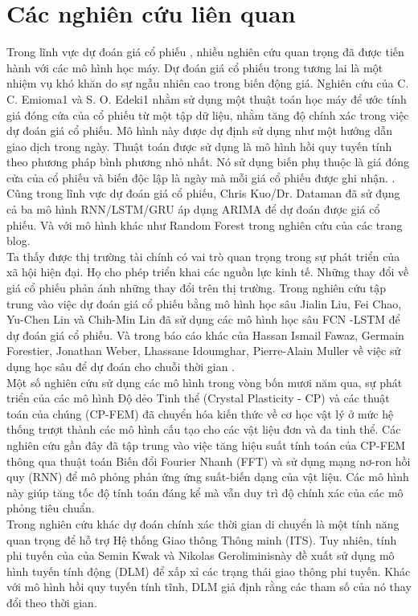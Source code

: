 \documentclass[conference]{IEEEtran}
\begin{document}
\section{Các nghiên cứu liên quan}
Trong lĩnh vực dự đoán giá cổ phiếu , nhiều nghiên cứu quan trọng đã được tiến hành với các mô hình học máy. Dự đoán giá cổ phiếu trong tương lai là một nhiệm vụ khó khăn do sự ngẫu nhiên cao trong biến động giá. Nghiên cứu của C. C. Emioma1 và S. O. Edeki1 nhằm sử dụng một thuật toán học máy để ước tính giá đóng cửa của cổ phiếu từ một tập dữ liệu, nhằm tăng độ chính xác trong việc dự đoán giá cổ phiếu. Mô hình này được dự định sử dụng như một hướng dẫn giao dịch trong ngày. Thuật toán được sử dụng là mô hình hồi quy tuyến tính theo phương pháp bình phương nhỏ nhất. Nó sử dụng biến phụ thuộc là giá đóng cửa của cổ phiếu và biến độc lập là ngày mà mỗi giá cổ phiếu được ghi nhận. \cite{b1}. 
Cũng trong lĩnh vực dự đoán giá cổ phiếu, Chris Kuo/Dr. Dataman đã sử đụng cả ba mô hình RNN/LSTM/GRU áp dụng ARIMA để dự đoán được giá cổ phiếu\cite{b2}. Và với mô hình khác như Random Forest trong nghiên cứu của các trang blog\cite{b3}.\\
Ta thấy được thị trường tài chính có vai trò quan trọng trong sự phát triển của xã hội hiện đại. Họ cho phép triển khai các nguồn lực kinh tế. Những thay đổi về giá cổ phiếu phản ánh những thay đổi trên thị trường. Trong nghiên cứu tập trung vào việc dự đoán giá cổ phiếu bằng mô hình học sâu Jialin Liu, Fei Chao, Yu-Chen Lin và Chih-Min Lin đã sử dụng các mô hình học sâu FCN -LSTM để dự đoán giá cổ phiếu\cite{b4}.
Và trong báo cáo khác của Hassan Ismail Fawaz, Germain Forestier, Jonathan Weber, Lhassane Idoumghar, Pierre-Alain Muller về việc sử dụng học sâu để dự đoán cho chuỗi thời gian \cite{b5}.\\
Một số nghiên cứu sử dụng các mô hình trong vòng bốn mươi năm qua, sự phát triển của các mô hình Độ dẻo Tinh thể (Crystal Plasticity - CP) và các thuật toán của chúng (CP-FEM) đã chuyển hóa kiến thức về cơ học vật lý ở mức hệ thống trượt thành các mô hình cấu tạo cho các vật liệu đơn và đa tinh thể. Các nghiên cứu gần đây đã tập trung vào việc tăng hiệu suất tính toán của CP-FEM thông qua thuật toán Biến đổi Fourier Nhanh (FFT) và sử dụng mạng nơ-ron hồi quy (RNN) để mô phỏng phản ứng ứng suất-biến dạng của vật liệu. Các mô hình này giúp tăng tốc độ tính toán đáng kể mà vẫn duy trì độ chính xác của các mô phỏng tiêu chuẩn\cite{b6}.\\
Trong nghiên cứu khác dự đoán chính xác thời gian di chuyển là một tính năng quan trọng để hỗ trợ Hệ thống Giao thông Thông minh (ITS). Tuy nhiên, tính phi tuyến của của Semin Kwak và Nikolas Geroliminisnày \cite{b7} đề xuất sử dụng mô hình tuyến tính động (DLM) để xấp xỉ các trạng thái giao thông phi tuyến. Khác với mô hình hồi quy tuyến tính tĩnh, DLM giả định rằng các tham số của nó thay đổi theo thời gian. 
\end{document}
